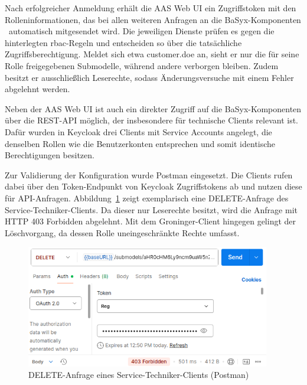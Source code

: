 \vspace{-0.35em}

Nach erfolgreicher Anmeldung erhält die AAS Web UI ein Zugriffstoken mit den Rolleninformationen, das bei allen weiteren Anfragen an die BaSyx-Komponenten%
\pagebreak
~automatisch mitgesendet wird.
Die jeweiligen Dienste prüfen es gegen die hinterlegten \acs{rbac}-Regeln und entscheiden so über die tatsächliche Zugriffsberechtigung.
Meldet sich etwa customer.doe an, sieht er nur die für seine Rolle freigegebenen Submodelle, während andere verborgen bleiben.
Zudem besitzt er ausschließlich Leserechte, sodass Änderungsversuche mit einem Fehler abgelehnt werden.

Neben der AAS Web UI ist auch ein direkter Zugriff auf die BaSyx-Komponenten über die REST-API möglich, der insbesondere für technische Clients relevant ist. 
Dafür wurden in Keycloak drei Clients mit Service Accounts angelegt, die denselben Rollen wie die Benutzerkonten entsprechen und somit identische Berechtigungen besitzen.

Zur Validierung der Konfiguration wurde Postman eingesetzt. 
Die Clients rufen dabei über den Token-Endpunkt von Keycloak Zugriffstokens ab und nutzen diese für API-Anfragen. 
Abbildung~\ref{fig:DELETEServiceTechniker} zeigt exemplarisch eine DELETE-Anfrage des Service-Techniker-Clients. 
Da dieser nur Leserechte besitzt, wird die Anfrage mit HTTP 403 Forbidden abgelehnt. 
Mit dem Groninger-Client hingegen gelingt der Löschvorgang, da dessen Rolle uneingeschränkte Rechte umfasst.

\vspace{0.25em}
\begin{figure}[htbp]
    \centering
        \includegraphics[width=0.95\textwidth]{Bilder/Ergebnisse/DPP/Postman/TechnicianDelet.png}
    \caption[DELETE-Anfrage eines Service-Techniker-Clients]{DELETE-Anfrage eines Service-Techniker-Clients (Postman)}
    \label{fig:DELETEServiceTechniker}
\end{figure}
\vspace{-0.25em}

